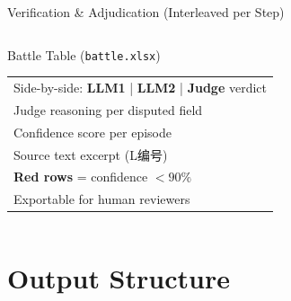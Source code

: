 \documentclass[aspectratio=169, 10pt]{beamer}
\newcommand{\llmone}{\textcolor{llm1color}{\textbf{LLM1}}}
\newcommand{\llmtwo}{\textcolor{llm2color}{\textbf{LLM2}}}
\newcommand{\judge}{\textcolor{judgecolor}{\textbf{Judge}}}
\begin{document}
\begin{frame}{Verification \& Adjudication (Interleaved per Step)}
\begin{columns}[T]
    \bigskip
    \begin{block}{Battle Table (\texttt{battle.xlsx})}
      \scriptsize
      \begin{tabular}{l}
        Side-by-side: \llmone{} | \llmtwo{} | \judge{} verdict \\
        Judge reasoning per disputed field \\
        Confidence score per episode \\
        Source text excerpt (L编号) \\[2pt]
        \textcolor{alertred}{\textbf{Red rows}} = confidence $< 90\%$ \\
        Exportable for human reviewers
      \end{tabular}
    \end{block}
  \end{columns}
\end{frame}

\section{Output Structure}
\end{document}

